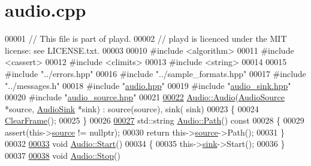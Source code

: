 \hypertarget{audio_8cpp_source}{\section{audio.\+cpp}
\label{audio_8cpp_source}
}

\begin{DoxyCode}
00001 \textcolor{comment}{// This file is part of playd.}
00002 \textcolor{comment}{// playd is licenced under the MIT license: see LICENSE.txt.}
00003 
00010 \textcolor{preprocessor}{#include <algorithm>}
00011 \textcolor{preprocessor}{#include <cassert>}
00012 \textcolor{preprocessor}{#include <climits>}
00013 \textcolor{preprocessor}{#include <string>}
00014 
00015 \textcolor{preprocessor}{#include "../errors.hpp"}
00016 \textcolor{preprocessor}{#include "../sample\_formats.hpp"}
00017 \textcolor{preprocessor}{#include "../messages.h"}
00018 \textcolor{preprocessor}{#include "\hyperlink{audio_8hpp}{audio.hpp}"}
00019 \textcolor{preprocessor}{#include "\hyperlink{audio__sink_8hpp}{audio\_sink.hpp}"}
00020 \textcolor{preprocessor}{#include "\hyperlink{audio__source_8hpp}{audio\_source.hpp}"}
00021 
\hypertarget{audio_8cpp_source_l00022}{}\hyperlink{classAudio_a05b36040e9d4ea4327de7c04f2e9d6ba}{00022} \hyperlink{classAudio_a05b36040e9d4ea4327de7c04f2e9d6ba}{Audio::Audio}(\hyperlink{classAudioSource}{AudioSource} *source, \hyperlink{classAudioSink}{AudioSink} *sink) : source(source), sink(
      sink)
00023 \{
00024     \hyperlink{classAudio_ad35726949e5de23e62024eba476c7ecf}{ClearFrame}();
00025 \}
00026 
\hypertarget{audio_8cpp_source_l00027}{}\hyperlink{classAudio_a07d67a424301e3e859e78fe30fb05d68}{00027} std::string \hyperlink{classAudio_a07d67a424301e3e859e78fe30fb05d68}{Audio::Path}()\textcolor{keyword}{ const}
00028 \textcolor{keyword}{}\{
00029     assert(this->\hyperlink{classAudio_a0efa7be67424d967c551ecc82cda02eb}{source} != \textcolor{keyword}{nullptr});
00030     \textcolor{keywordflow}{return} this->\hyperlink{classAudio_a0efa7be67424d967c551ecc82cda02eb}{source}->Path();
00031 \}
00032 
\hypertarget{audio_8cpp_source_l00033}{}\hyperlink{classAudio_a545c9a12f31bc6964ac90bbf2358ada2}{00033} \textcolor{keywordtype}{void} \hyperlink{classAudio_a545c9a12f31bc6964ac90bbf2358ada2}{Audio::Start}()
00034 \{
00035     this->\hyperlink{classAudio_ae7dddd283486a0d1555e9bc6a0d63cff}{sink}->Start();
00036 \}
00037 
\hypertarget{audio_8cpp_source_l00038}{}\hyperlink{classAudio_a1bd980bcdd3778875b019d7352e75754}{00038} \textcolor{keywordtype}{void} \hyperlink{classAudio_a1bd980bcdd3778875b019d7352e75754}{Audio::Stop}()

\end{DoxyCode}
